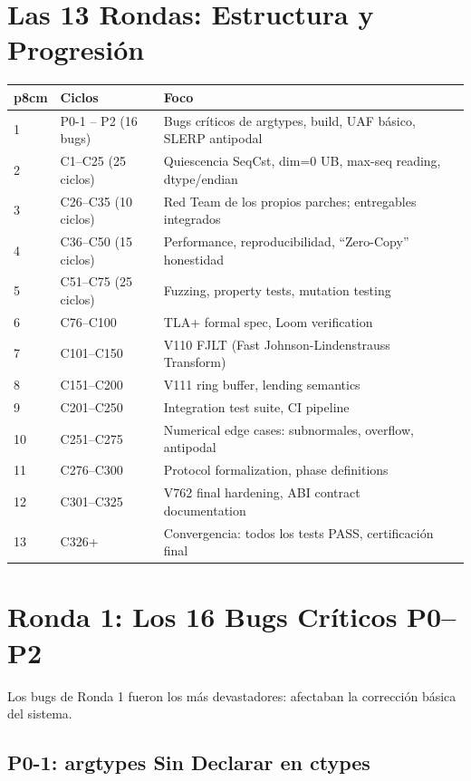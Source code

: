 \section{Las 13 Rondas: Estructura y Progresión}

\begin{tabular}{llll}p{8cm}}
\hline
\textbf{Ronda} & \textbf{Ciclos} & \textbf{Foco} \\
\hline
1 & P0-1 -- P2 (16 bugs) & Bugs críticos de argtypes, build, UAF básico, SLERP antipodal \\
2 & C1--C25 (25 ciclos) & Quiescencia SeqCst, dim=0 UB, max-seq reading, dtype/endian \\
3 & C26--C35 (10 ciclos) & Red Team de los propios parches; entregables integrados \\
4 & C36--C50 (15 ciclos) & Performance, reproducibilidad, ``Zero-Copy'' honestidad \\
5 & C51--C75 (25 ciclos) & Fuzzing, property tests, mutation testing \\
6 & C76--C100 & TLA+ formal spec, Loom verification \\
7 & C101--C150 & V110 FJLT (Fast Johnson-Lindenstrauss Transform) \\
8 & C151--C200 & V111 ring buffer, lending semantics \\
9 & C201--C250 & Integration test suite, CI pipeline \\
10 & C251--C275 & Numerical edge cases: subnormales, overflow, antipodal \\
11 & C276--C300 & Protocol formalization, phase definitions \\
12 & C301--C325 & V762 final hardening, ABI contract documentation \\
13 & C326+ & Convergencia: todos los tests PASS, certificación final \\
\hline


\end{tabular}

\section{Ronda 1: Los 16 Bugs Críticos P0--P2}

Los bugs de Ronda 1 fueron los más devastadores: afectaban la corrección básica del sistema.

\subsection{P0-1: argtypes Sin Declarar en ctypes}


